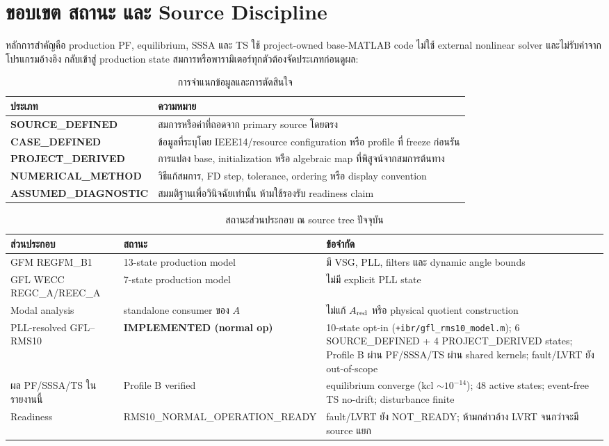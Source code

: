 \documentclass[12pt,a4paper]{article}
\newcommand{\implemented}{\textcolor{green!50!black}{\textbf{IMPLEMENTED (normal op)}}}
\begin{document}
\section{ขอบเขต สถานะ และ Source Discipline}

หลักการสำคัญคือ production PF, equilibrium, SSSA และ TS ใช้ project-owned
base-MATLAB code ไม่ใช้ external nonlinear solver และไม่รับค่าจากโปรแกรมอ้างอิง
กลับเข้าสู่ production state สมการหรือพารามิเตอร์ทุกตัวต้องจัดประเภทก่อนดูผล:

\begin{table}[H]\centering
\caption{การจำแนกข้อมูลและการตัดสินใจ}
\begin{tabularx}{\textwidth}{>{\bfseries}p{}X}
\toprule
ประเภท & ความหมาย \\\midrule
SOURCE\_DEFINED & สมการหรือค่าที่ถอดจาก primary source โดยตรง \\
CASE\_DEFINED & ข้อมูลที่ระบุโดย IEEE14/resource configuration หรือ profile ที่ freeze ก่อนรัน \\
PROJECT\_DERIVED & การแปลง base, initialization หรือ algebraic map ที่พิสูจน์จากสมการต้นทาง \\
NUMERICAL\_METHOD & วิธีแก้สมการ, FD step, tolerance, ordering หรือ display convention \\
ASSUMED\_DIAGNOSTIC & สมมติฐานเพื่อวินิจฉัยเท่านั้น ห้ามใช้รองรับ readiness claim \\
\bottomrule
\end{tabularx}
\end{table}

\begin{table}[H]\centering
\caption{สถานะส่วนประกอบ ณ source tree ปัจจุบัน}
\begin{tabularx}{\textwidth}{p{}p{}X}
\toprule
ส่วนประกอบ & สถานะ & ข้อจำกัด \\\midrule
GFM REGFM\_B1 & 13-state production model & มี VSG, PLL, filters และ dynamic angle bounds \\
GFL WECC REGC\_A/REEC\_A & 7-state production model & ไม่มี explicit PLL state \\
Modal analysis & standalone consumer ของ $A$ & ไม่แก้ $A_{\rm red}$ หรือ physical quotient construction \\
PLL-resolved GFL--RMS10 & \implemented & 10-state opt-in (\texttt{+ibr/gfl\_rms10\_model.m}); 6 SOURCE\_DEFINED + 4 PROJECT\_DERIVED states; Profile B ผ่าน PF/SSSA/TS ผ่าน shared kernels; fault/LVRT ยัง out-of-scope \\
ผล PF/SSSA/TS ในรายงานนี้ & Profile B verified & equilibrium converge (kcl $\sim 10^{-14}$); 48 active states; event-free TS no-drift; disturbance finite \\
Readiness & RMS10\_NORMAL\_OPERATION\_READY & fault/LVRT ยัง NOT\_READY; ห้ามกล่าวอ้าง LVRT จนกว่าจะมี source แยก \\
\bottomrule
\end{tabularx}
\end{table}
\end{document}
